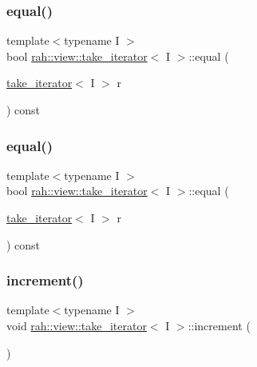 \subsubsection{\texorpdfstring{equal()}{equal()}\hspace{0.1cm}{\footnotesize\ttfamily [1/2]}}
{\footnotesize\ttfamily template$<$typename I $>$ \\
bool \mbox{\hyperlink{structrah_1_1view_1_1take__iterator}{rah\+::view\+::take\+\_\+iterator}}$<$ I $>$\+::equal (\begin{DoxyParamCaption}\item[{\mbox{\hyperlink{structrah_1_1view_1_1take__iterator}{take\+\_\+iterator}}$<$ I $>$}]{r }\end{DoxyParamCaption}) const\hspace{0.3cm}{\ttfamily [inline]}}

\mbox{\label{structrah_1_1view_1_1take__iterator_a222e31de32a4780e1f0f0f6d9d963ded}} 
\subsubsection{\texorpdfstring{equal()}{equal()}\hspace{0.1cm}{\footnotesize\ttfamily [2/2]}}
{\footnotesize\ttfamily template$<$typename I $>$ \\
bool \mbox{\hyperlink{structrah_1_1view_1_1take__iterator}{rah\+::view\+::take\+\_\+iterator}}$<$ I $>$\+::equal (\begin{DoxyParamCaption}\item[{\mbox{\hyperlink{structrah_1_1view_1_1take__iterator}{take\+\_\+iterator}}$<$ I $>$}]{r }\end{DoxyParamCaption}) const\hspace{0.3cm}{\ttfamily [inline]}}

\mbox{\label{structrah_1_1view_1_1take__iterator_a5a1663517c2525b6cd6ed27f82047ba8}} 
\subsubsection{\texorpdfstring{increment()}{increment()}\hspace{0.1cm}{\footnotesize\ttfamily [1/2]}}
{\footnotesize\ttfamily template$<$typename I $>$ \\
void \mbox{\hyperlink{structrah_1_1view_1_1take__iterator}{rah\+::view\+::take\+\_\+iterator}}$<$ I $>$\+::increment (\begin{DoxyParamCaption}{ }\end{DoxyParamCaption})\hspace{0.3cm}{\ttfamily [inline]}}

